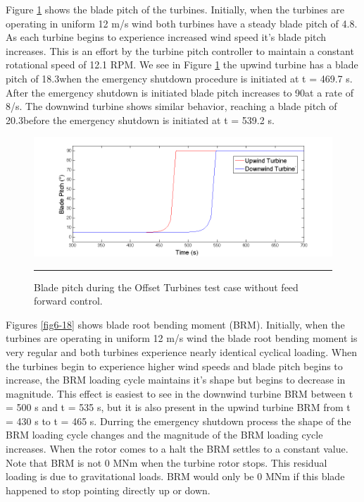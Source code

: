 Figure \ref{fig6-17} shows the blade pitch of the turbines. Initially, when the turbines are operating in uniform 12 m/s wind both turbines have a steady blade pitch of 4.8\degree. As each turbine begins to experience increased wind speed it's blade pitch increases. This is an effort by the turbine pitch controller to maintain a constant rotational speed of 12.1 RPM. We see in Figure \ref{fig6-17} the upwind turbine has a blade pitch of 18.3\degree when the emergency shutdown procedure is initiated at t = 469.7 s. After the emergency shutdown is initiated blade pitch increases to 90\degree at a rate of 8\degree /s. The downwind turbine shows similar behavior, reaching a blade pitch of 20.3\degree before the emergency shutdown is initiated at t = 539.2 s.

\begin{figure}[htbp] \label{fig6-17}
	\centering
		\includegraphics[trim = {1cm 0 2cm 0}, clip, width = \linewidth]{Figures/ch6Figures/fig6-17.png}
		\rule{35em}{0.5pt}
	\caption{Blade pitch during the Offset Turbines test case without feed forward control.}
\end{figure}

Figures \ref{fig6-18} shows blade root bending moment (BRM). Initially, when the turbines are operating in uniform 12 m/s wind the blade root bending moment is very regular and both turbines experience nearly identical cyclical loading. When the turbines begin to experience higher wind speeds and blade pitch begins to increase, the BRM loading cycle maintains it's shape but begins to decrease in magnitude. This effect is easiest to see in the downwind turbine BRM between t = 500 s and t = 535 s, but it is also present in the upwind turbine BRM from t = 430 s to t = 465 s. Durring the emergency shutdown process the shape of the BRM loading cycle changes and the magnitude of the BRM loading cycle increases. When the rotor comes to a halt the BRM settles to a constant value. Note that BRM is not 0 MNm when the turbine rotor stops. This residual loading is due to gravitational loads. BRM would only be 0 MNm if this blade happened to stop pointing directly up or down.

